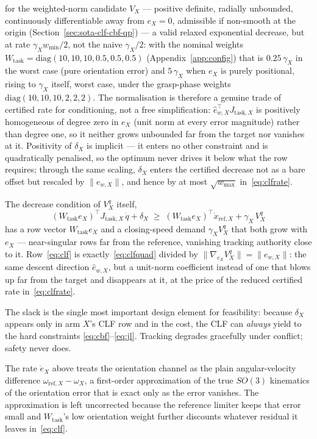 \documentclass[12pt,a4paper,twoside,openright]{report}
\newcommand{\qdot}{\dot{q}}
\begin{document}
for the weighted-norm candidate $V_X$ --- positive definite, radially unbounded, continuously differentiable away from $e_X = 0$, admissible if non-smooth at the origin (Section~\ref{sec:sota-clf-cbf-qp}) --- a valid relaxed exponential decrease, but at rate $\gamma_X w_{\min}/2$, not the naive $\gamma_X/2$: with the nominal weights $W_{\text{task}} = \mathrm{diag}(10,10,10,0.5,0.5,0.5)$ (Appendix~\ref{app:config}) that is $0.25\,\gamma_X$ in the worst case (pure orientation error) and $5\,\gamma_X$ when $e_X$ is purely positional, rising to $\gamma_X$ itself, worst case, under the grasp-phase weights $\mathrm{diag}(10,10,10,2,2,2)$. The normalisation is therefore a genuine trade of certified rate for conditioning, not a free simplification: $\hat{e}_{w,X}^{\top}J_{\text{task},X}$ is positively homogeneous of degree zero in $e_X$ (unit norm at every error magnitude) rather than degree one, so it neither grows unbounded far from the target nor vanishes at it. Positivity of $\delta_X$ is implicit --- it enters no other constraint and is quadratically penalised, so the optimum never drives it below what the row requires; through the same scaling, $\delta_X$ enters the certified decrease not as a bare offset but rescaled by $\|e_{w,X}\|$, and hence by at most $\sqrt{w_{\max}}$ in~\eqref{eq:clfrate}.

The decrease condition of $V_X^{q}$ itself,
\begin{equation}
(W_{\text{task}}e_X)^{\top} J_{\text{task},X}\,\qdot + \delta_X
\;\ge\;
(W_{\text{task}}e_X)^{\top}\dot{x}_{\text{ref},X} + \gamma_X\, V_X^{q}
\label{eq:clfquad}
\end{equation}
has a row vector $W_{\text{task}}e_X$ and a closing-speed demand $\gamma_X V_X^{q}$ that both grow with $e_X$ --- near-singular rows far from the reference, vanishing tracking authority close to it. Row~\eqref{eq:clf} is exactly~\eqref{eq:clfquad} divided by $\|\nabla_{e_X} V_X^{q}\| = \|e_{w,X}\|$: the same descent direction $\hat{e}_{w,X}$, but a unit-norm coefficient instead of one that blows up far from the target and disappears at it, at the price of the reduced certified rate in~\eqref{eq:clfrate}.

The slack is the single most important design element for feasibility: because $\delta_X$ appears only in arm $X$'s CLF row and in the cost, the CLF can \emph{always} yield to the hard constraints \eqref{eq:cbf}--\eqref{eq:jl}. Tracking degrades gracefully under conflict; safety never does.

The rate $\dot{e}_X$ above treats the orientation channel as the plain angular-velocity difference $\omega_{\text{ref},X} - \omega_X$, a first-order approximation of the true $SO(3)$ kinematics of the orientation error that is exact only as the error vanishes. The approximation is left uncorrected because the reference limiter keeps that error small and $W_{\text{task}}$'s low orientation weight further discounts whatever residual it leaves in~\eqref{eq:clf}.
\end{document}
